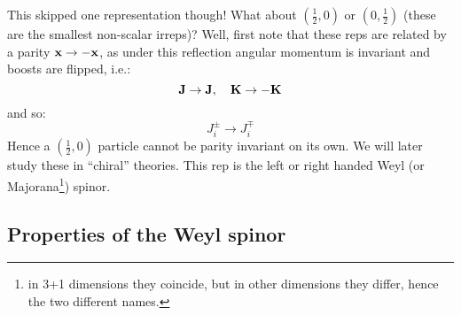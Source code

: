 This skipped one representation though! What about $(\frac{1}{2}, 0)$ or $(0, \frac{1}{2})$ (these are the smallest non-scalar irreps)? Well, first note that these reps are related by a parity $\mathbf{x} \to -\mathbf{x}$, as under this reflection angular momentum is invariant and boosts are flipped, i.e.:
\begin{equation}
    \mathbf{J} \to \mathbf{J}, \quad \mathbf{K} \to -\mathbf{K}
\end{equation}
and so:
\begin{equation}
    J_i^\pm \to J_i^\mp
\end{equation}
Hence a $(\frac{1}{2}, 0)$ particle cannot be parity invariant on its own. We will later study these in ``chiral'' theories. This rep is the left or right handed Weyl (or Majorana\footnote{in 3+1 dimensions they coincide, but in other dimensions they differ, hence the two different names.}) spinor.

\subsection{Properties of the Weyl spinor}


